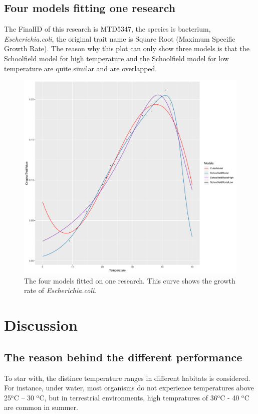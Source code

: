 \documentclass[11pt]{article}
\begin{document}
	\subsection{Four models fitting one research}
	The FinalID of this research is MTD5347\citep{ratkowsky2005unifying}, the species is bacterium, \textit{Escherichia.coli}, the original trait name is Square Root (Maximum Specific Growth Rate).  The reason why this plot can only show three models is that the Schoolfield model for high temperature and the Schoolfield model for low temperature are quite similar and are overlapped. 
		\begin{figure}[H]
		\centering
		\includegraphics[width = \textwidth]{../Results/model_951.pdf}
		\caption{The four models fitted on one research. This curve shows the growth rate of \textit{Escherichia.coli}. }
	\end{figure}
	
		\section{Discussion}
		\subsection{The reason behind the different performance}
		To star with, the distince temperature ranges in different habitats is considered. For instance, under water, most organisms do not experience temperatures above 25$^\text{o}$C – 30 $^\text{o}$C, but in terrestrial environments, high tempratures of 36$^\text{o}$C - 40 $^\text{o}$C are common in summer. 
		
\end{document}
